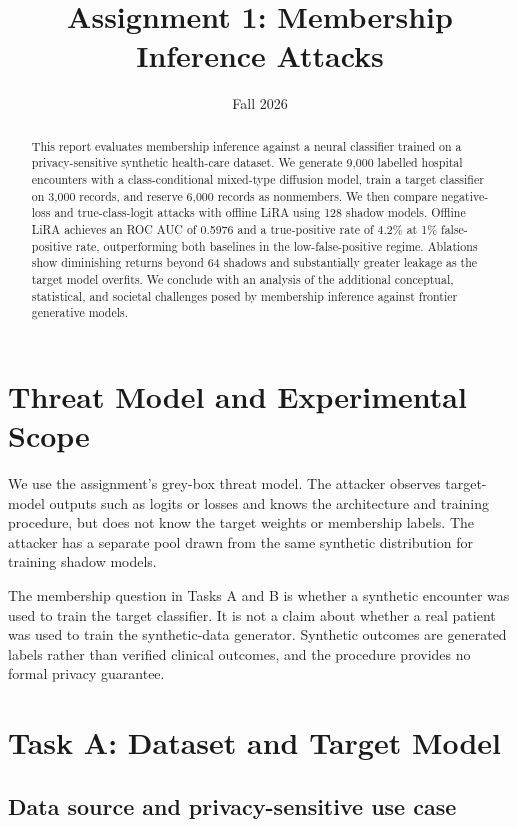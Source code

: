 \documentclass[11pt]{article}
\title{Assignment 1: Membership Inference Attacks}
\author{}
\date{Fall 2026}
\begin{document}
\maketitle

\begin{abstract}
This report evaluates membership inference against a neural classifier trained on a
privacy-sensitive synthetic health-care dataset. We generate 9,000 labelled hospital
encounters with a class-conditional mixed-type diffusion model, train a target classifier
on 3,000 records, and reserve 6,000 records as nonmembers. We then compare negative-loss
and true-class-logit attacks with offline LiRA using 128 shadow models. Offline LiRA
achieves an ROC AUC of 0.5976 and a true-positive rate of 4.2\% at 1\% false-positive
rate, outperforming both baselines in the low-false-positive regime. Ablations show
diminishing returns beyond 64 shadows and substantially greater leakage as the target
model overfits. We conclude with an analysis of the additional conceptual, statistical,
and societal challenges posed by membership inference against frontier generative models.
\end{abstract}

\section{Threat Model and Experimental Scope}

We use the assignment's grey-box threat model. The attacker observes target-model outputs
such as logits or losses and knows the architecture and training procedure, but does not
know the target weights or membership labels. The attacker has a separate pool drawn from
the same synthetic distribution for training shadow models.

The membership question in Tasks A and B is whether a synthetic encounter was used to
train the target classifier. It is not a claim about whether a real patient was used to
train the synthetic-data generator. Synthetic outcomes are generated labels rather than
verified clinical outcomes, and the procedure provides no formal privacy guarantee.

\section{Task A: Dataset and Target Model}

\subsection{Data source and privacy-sensitive use case}
\end{document}
